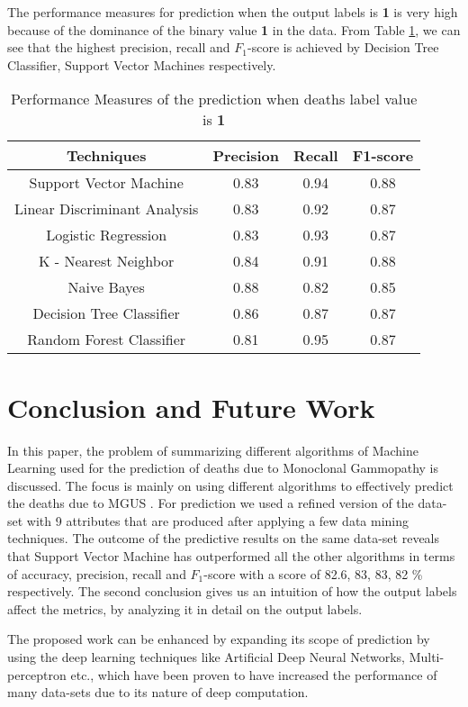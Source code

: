 \documentclass[conference]{IEEEtran}
\begin{document}
The performance measures for prediction when the output labels is \textbf{1} is very high because of the dominance of the binary value \textbf{1} in the data. From Table \ref{table:3}, we can see that the highest precision, recall and $F_1$-score is achieved by Decision Tree Classifier, Support Vector Machines respectively. 
\begin{table}[H]
\centering
 \begin{tabular}{|c| c c c|} 
 \hline
 Techniques  & Precision & Recall & F1-score \\ [0.5ex] 
 \hline
 Support Vector Machine & 0.83 & 0.94 & 0.88 \\ 
 \hline
 Linear Discriminant Analysis & 0.83 & 0.92 & 0.87\\
 \hline
 Logistic Regression & 0.83 & 0.93 & 0.87\\
 \hline
 K - Nearest Neighbor & 0.84 & 0.91 & 0.88\\
 \hline
 Naive Bayes & 0.88 & 0.82 & 0.85\\  
 \hline
 Decision Tree Classifier & 0.86 & 0.87 & 0.87 \\
 \hline
 Random Forest Classifier & 0.81 & 0.95 & 0.87  \\[0.75ex] 
 \hline
\end{tabular}
\vspace*{0.25cm}
\caption{Performance Measures of the prediction when deaths label value is \textbf{1}}
\label{table:3}
\end{table}


\section{Conclusion and Future Work}
In this paper, the problem of summarizing different algorithms of Machine Learning used for the prediction of deaths due to Monoclonal Gammopathy is discussed. The focus is mainly on using different algorithms to effectively predict the deaths due to MGUS \cite{monoclonal1} . For prediction we used a refined version of the data-set with 9 attributes that are produced after applying a few data mining techniques. The outcome of the predictive results on the same data-set reveals that Support Vector Machine has outperformed all the other algorithms in terms   of accuracy, precision, recall and $F_1$-score with a score of 82.6, 83, 83, 82 \% respectively. The second conclusion gives us an intuition of how the output labels affect the metrics, by analyzing it in detail on the output labels.
\par 
The proposed work can be enhanced by expanding its scope of prediction by using  the deep learning techniques \cite{dl,dl2}  like Artificial  Deep Neural Networks, Multi-perceptron etc.,
which have been proven to have increased the performance of many data-sets due to its nature of deep computation.







\end{document}

